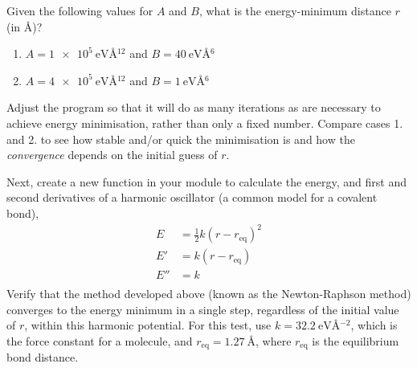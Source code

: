 \documentclass[a4paper]{article}
\begin{document}
Given the following values for $A$ and $B$, what is the energy-minimum distance $r$ (in \AA)?
\begin{enumerate}
  \item{$A = \SI{1e5}{\eV\angstrom^{12}}$ and $B = \SI{40}{\eV\angstrom^{6}}$}
  \item{$A = \SI{4e5}{\eV\angstrom^{12}}$ and $B = \SI{1}{\eV\angstrom^{6}}$}
\end{enumerate}
Adjust the program so that it will do as many iterations as are necessary to achieve energy minimisation, rather than only a fixed number.
Compare cases 1. and 2. to see how stable and/or quick the minimisation is and how the \emph{convergence} depends on the initial guess of $r$.

Next, create a new function in your module to calculate the energy, and first and second derivatives of a harmonic oscillator (a common model for a covalent bond),
\begin{equation}
  \begin{aligned}
    E & = \frac{1}{2}k(r-r_{\text{eq}})^2 \\
    E' & = k(r-r_{\text{eq}}) \\
    E'' & = k \\
  \end{aligned}
\end{equation}
Verify that the method developed above (known as the Newton-Raphson method) converges to the energy minimum in a single step, regardless of the initial value of $r$, within this harmonic potential.
For this test, use $k = \SI{32.2}{\eV\angstrom^{-2}}$, which is the force constant for a  molecule, and $r_{\text{eq}}=\SI{1.27}{\angstrom}$, where $r_{\text{eq}}$ is the equilibrium bond distance.


%
%
\end{document}
